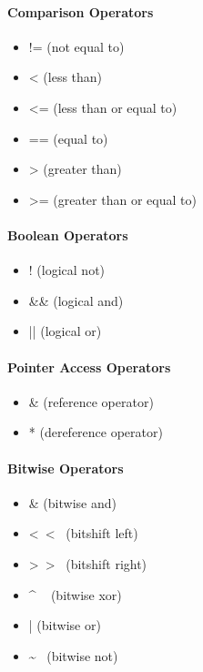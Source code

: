 \documentclass[../informe_krapp.tex]{subfiles}
\begin{document}
\begin{multicols}{2}
	\paragraph{Comparison Operators}
	\begin{itemize}
		\item != (not equal to)
		\item < (less than)
		\item <= (less than or equal to)
		\item == (equal to)
		\item > (greater than)
		\item >= (greater than or equal to)
	\end{itemize}

	\paragraph{Boolean Operators}
	\begin{itemize}
		\item ! (logical not)
		\item \&\& (logical and)
		\item || (logical or)
	\end{itemize}

	\paragraph{Pointer Access Operators}
	\begin{itemize}
		\item \& (reference operator)
		\item * (dereference operator)
	\end{itemize}

	\paragraph{Bitwise Operators}
	\begin{itemize}
		\item \& (bitwise and)
		\item <~<~ (bitshift left)
		\item >~>~ (bitshift right)
		\item \^ ~ (bitwise xor)
		\item | (bitwise or)
		\item \~~ (bitwise not)
	\end{itemize}


\end{multicols}
\end{document}
